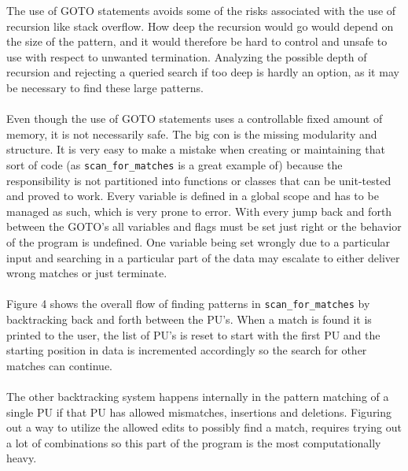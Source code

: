 \documentclass[12pt]{article}
\newcommand{\scm}{\texttt{scan\_for\_matches} }
\newcommand{\pu}{PU }
\newcommand{\pus}{PU's }
\begin{document}
\noindent The use of GOTO statements avoids some of the risks associated with the use of recursion like stack overflow. 
How deep the recursion would go would depend on the size of the pattern, and it would therefore be hard to control and
unsafe to use with respect to unwanted termination. Analyzing the possible depth of recursion and rejecting a queried search
if too deep is hardly an option, as it may be necessary to find these large patterns. \\ \\
Even though the use of GOTO statements uses a controllable fixed amount of
memory, it is not necessarily safe. The big con is the missing modularity and structure. 
It is very easy to make a mistake when creating or maintaining that sort of code
(as \scm is a great example of)
because the responsibility is not partitioned into functions or classes that can be unit-tested and proved to work.
Every variable is defined in a global scope and has to be managed as such, which is very prone to error. With every
jump back and forth between the GOTO's all variables and flags must be set just right or the behavior of the program
is undefined. 
One variable being set wrongly due to a particular input and searching in a particular part of the data may 
escalate to either deliver wrong matches or just terminate. \\ \\
Figure 4 shows the overall flow of finding patterns in \scm by backtracking back and forth between the PU's. When
a match is found it is printed to the user, the list of \pus is reset to start with the first \pu and the 
starting position in data is incremented accordingly so the search for other matches can continue. \\ \\
The other backtracking system happens internally in the pattern matching of a single \pu if that \pu has allowed
mismatches, insertions and deletions. Figuring out a way to utilize the allowed edits to possibly find a match, requires
trying out a lot of combinations so this part of the program is the most computationally heavy. 
\end{document}
